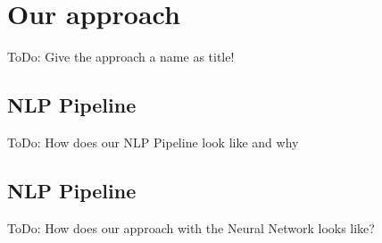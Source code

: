 \section{Our approach} %
\label{sec:nlp}

\colorbox{yellow!30}{ToDo:} Give the approach a name as title!

\subsection{NLP Pipeline} %
\label{sub:nlp_pipeline}

\colorbox{yellow!30}{ToDo:} How does our NLP Pipeline look like and why

\subsection{NLP Pipeline} %
\label{sub:nlp_pipeline}

\colorbox{yellow!30}{ToDo:} How does our approach with the Neural Network looks like?
